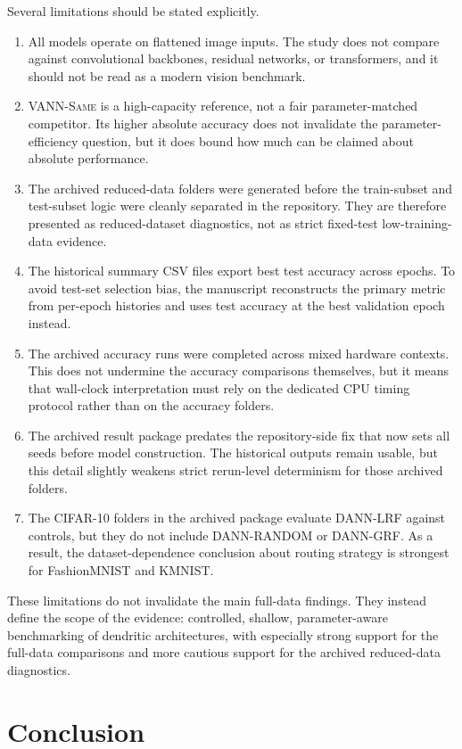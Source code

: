 \documentclass[preprint,12pt]{elsarticle}
\newcommand{\DANNLRF}{\textsc{DANN-LRF}}
\newcommand{\DANNRANDOM}{\textsc{DANN-RANDOM}}
\newcommand{\DANNGRF}{\textsc{DANN-GRF}}
\newcommand{\VANNSAME}{\textsc{VANN-Same}}
\begin{document}
Several limitations should be stated explicitly.
\begin{enumerate}
\item All models operate on flattened image inputs. The study does not compare against convolutional backbones, residual networks, or transformers, and it should not be read as a modern vision benchmark.
\item \VANNSAME{} is a high-capacity reference, not a fair parameter-matched competitor. Its higher absolute accuracy does not invalidate the parameter-efficiency question, but it does bound how much can be claimed about absolute performance.
\item The archived reduced-data folders were generated before the train-subset and test-subset logic were cleanly separated in the repository. They are therefore presented as reduced-dataset diagnostics, not as strict fixed-test low-training-data evidence.
\item The historical summary CSV files export best test accuracy across epochs. To avoid test-set selection bias, the manuscript reconstructs the primary metric from per-epoch histories and uses test accuracy at the best validation epoch instead.
\item The archived accuracy runs were completed across mixed hardware contexts. This does not undermine the accuracy comparisons themselves, but it means that wall-clock interpretation must rely on the dedicated CPU timing protocol rather than on the accuracy folders.
\item The archived result package predates the repository-side fix that now sets all seeds before model construction. The historical outputs remain usable, but this detail slightly weakens strict rerun-level determinism for those archived folders.
\item The CIFAR-10 folders in the archived package evaluate \DANNLRF{} against controls, but they do not include \DANNRANDOM{} or \DANNGRF{}. As a result, the dataset-dependence conclusion about routing strategy is strongest for FashionMNIST and KMNIST.
\end{enumerate}

These limitations do not invalidate the main full-data findings. They instead define the scope of the evidence: controlled, shallow, parameter-aware benchmarking of dendritic architectures, with especially strong support for the full-data comparisons and more cautious support for the archived reduced-data diagnostics.

\section{Conclusion}
\label{sec:conclusion}
\end{document}
